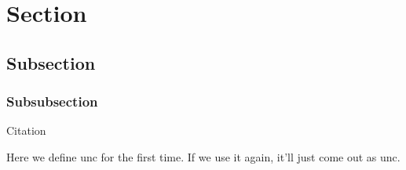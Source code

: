 \section{Section}
\subsection{Subsection}
\subsubsection{Subsubsection}
Citation \cite{bibkey1}

Here we define \gls{unc} for the first time. If we use it again, it'll just come out as \gls{unc}.